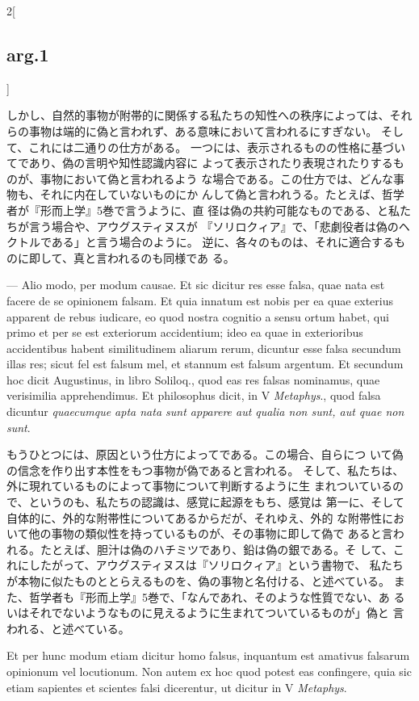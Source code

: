 \documentclass[paper=a4paper,fontsize=10pt,jafontsize=9pt,titlepage]{jlreq}
\begin{document}
\begin{paracol}{2}[\subsection{arg.1}]
\switchcolumn

しかし、自然的事物が附帯的に関係する私たちの知性への秩序によっては、それ
 らの事物は端的に偽と言われず、ある意味において言われるにすぎない。
そして、これには二通りの仕方がある。
一つには、表示されるものの性格に基づいてであり、偽の言明や知性認識内容に
 よって表示されたり表現されたりするものが、事物において偽と言われるよう
 な場合である。この仕方では、どんな事物も、それに内在していないものにか
 んして偽と言われうる。たとえば、哲学者が『形而上学』5巻で言うように、直
 径は偽の共約可能なものである、と私たちが言う場合や、アウグスティヌスが
 『ソリロクィア』で、「悲劇役者は偽のヘクトルである」と言う場合のように。
逆に、各々のものは、それに適合するものに即して、真と言われるのも同様であ
 る。

\switchcolumn*


--- Alio modo, per modum causae. Et sic dicitur res esse
falsa, quae nata est facere de se opinionem falsam. Et quia innatum est
nobis per ea quae exterius apparent de rebus iudicare, eo quod nostra
cognitio a sensu ortum habet, qui primo et per se est exteriorum
accidentium; ideo ea quae in exterioribus accidentibus habent
similitudinem aliarum rerum, dicuntur esse falsa secundum illas res;
sicut fel est falsum mel, et stannum est falsum argentum. Et secundum
hoc dicit Augustinus, in libro Soliloq., quod eas res falsas nominamus,
quae verisimilia apprehendimus. Et philosophus dicit, in V {\itshape
Metaphys}., quod falsa dicuntur {\itshape quaecumque apta nata sunt
apparere aut qualia non sunt, aut quae non sunt}.

\switchcolumn

もうひとつには、原因という仕方によってである。この場合、自らにつ
 いて偽の信念を作り出す本性をもつ事物が偽であると言われる。
そして、私たちは、外に現れているものによって事物について判断するように生
 まれついているので、というのも、私たちの認識は、感覚に起源をもち、感覚は
 第一に、そして自体的に、外的な附帯性についてあるからだが、それゆえ、外的
 な附帯性において他の事物の類似性を持っているものが、その事物に即して偽で
 あると言われる。たとえば、胆汁は偽のハチミツであり、鉛は偽の銀である。そ
 して、これにしたがって、アウグスティヌスは『ソリロクィア』という書物で、
 私たちが本物に似たものととらえるものを、偽の事物と名付ける、と述べている。
 また、哲学者も『形而上学』5巻で、「なんであれ、そのような性質でない、あ
 るいはそれでないようなものに見えるように生まれてついているものが」偽と
 言われる、と述べている。

\switchcolumn*


Et per hunc modum
etiam dicitur homo falsus, inquantum est amativus falsarum opinionum vel
locutionum. Non autem ex hoc quod potest eas confingere, quia sic etiam
sapientes et scientes falsi dicerentur, ut dicitur in V {\itshape
Metaphys}.


\end{paracol}
\end{document}
